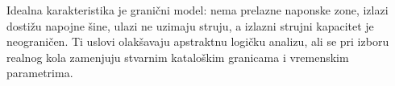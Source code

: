 Idealna karakteristika je granični model: nema prelazne naponske zone, izlazi dostižu napojne šine, ulazi ne uzimaju struju, a izlazni strujni kapacitet je neograničen. Ti uslovi olakšavaju apstraktnu logičku analizu, ali se pri izboru realnog kola zamenjuju stvarnim kataloškim granicama i vremenskim parametrima.
